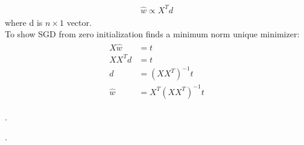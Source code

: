 \documentclass{myhw}
\begin{document}
\begin{homeworkProblem}
\begin{homeworkSection}
\begin{gather*}
\begin{aligned}
\hat{w} \propto X^T d
\end{aligned}
\end{gather*}
where d is $n \times 1$ vector. \\
To show SGD from zero initialization finds a minimum norm unique minimizer: 
\begin{gather*}
\begin{aligned}
X\hat{w} &= t \\
X X^T d &= t \\
d &= (XX^T)^{-1} t \\
\hat{w} &= X^T (XX^T)^{-1} t
\end{aligned}
\end{gather*}
\end{homeworkSection}
\begin{homeworkSection}
\end{homeworkSection}
\begin{homeworkSection}
\end{homeworkSection}
\end{homeworkProblem}


\begin{homeworkProblem}
.
\begin{homeworkSection}
\end{homeworkSection}
\begin{homeworkSection}
\end{homeworkSection}
\begin{homeworkSection}
\end{homeworkSection}
\end{homeworkProblem}


\begin{homeworkProblem}
.
\begin{homeworkSection}
\end{homeworkSection}
\begin{homeworkSection}
\end{homeworkSection}
\begin{homeworkSection}
\end{homeworkSection}
\end{homeworkProblem}
\end{document}
